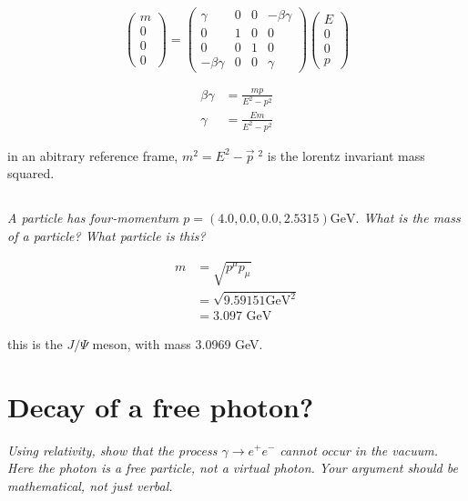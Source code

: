 \documentclass{article}
\begin{document}
\begin{equation}
\left(\begin{array}{l}
m \\
0 \\
0 \\
0
\end{array}\right)=\left(\begin{array}{llll}
\gamma & 0 & 0 & -\beta \gamma \\
0 & 1 & 0 & 0 \\
0 & 0 & 1 & 0 \\
-\beta \gamma & 0 & 0 & \gamma
\end{array}\right)\left(\begin{array}{l}
E \\
0 \\
0 \\
p
\end{array}\right)
\end{equation}

\begin{align*}
\beta \gamma&=\frac{m p}{E^{2}-p^{2}} \\
\gamma&=\frac{E m}{E^{2}-p^{2}}
\end{align*}

in an abitrary reference frame, $m^{2}=E^{2}-\vec{p}\;^{2}$ is the lorentz invariant  mass squared.

\subsection{}
\textit{A particle has four-momentum $p=(4.0,0.0,0.0,2.5315) \mathrm{GeV} .$ What is the mass of a particle? What particle is this?}

\begin{align*}
    m&=\sqrt{p^{\mu} p_{\mu}}\\
    &=\sqrt{9.59151 \mathrm{GeV}^{2}}\\
    &=3.097 \text { GeV }
\end{align*}

this is the $J/\Psi$ meson, with mass 3.0969 GeV.

\newpage


\section{Decay of a free photon?}
\textit{Using relativity, show that the process $\gamma \rightarrow e^{+} e^{-}$ cannot occur in the vacuum. Here the photon is a free particle, not a virtual photon. Your argument should be mathematical, not just verbal.}
\end{document}
